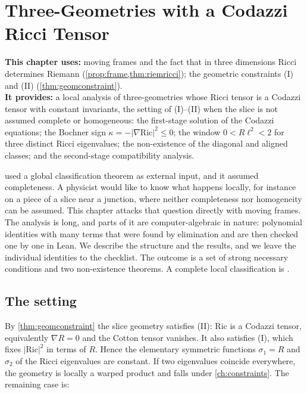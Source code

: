 \chapter{Three-Geometries with a Codazzi Ricci Tensor}
\label{ch:homogeneous}

\begin{usesbox}
\textbf{This chapter uses:} moving frames and the fact that in three dimensions Ricci determines Riemann (\cref{prop:frame,thm:riemricci}); the geometric constraints (I) and (II) (\cref{thm:geomconstraint}).\\
\textbf{It provides:} a local analysis of three-geometries whose Ricci tensor is a Codazzi tensor with constant invariants, the setting of (I)--(II) when the slice is not assumed complete or homogeneous: the first-stage solution of the Codazzi equations; the Bochner sign $\kappa=-|\nabla\mathrm{Ric}|^2\le0$; the window $0<R\ell^2<2$ for three distinct Ricci eigenvalues; the non-existence of the diagonal and aligned classes; and the second-stage compatibility analysis.
\end{usesbox}

 used a global classification theorem as external input, and it assumed completeness. A physicist would like to know what happens locally, for instance on a piece of a slice near a junction, where neither completeness nor homogeneity can be assumed. This chapter attacks that question directly with moving frames. The analysis is long, and parts of it are computer-algebraic in nature: polynomial identities with many terms that were found by elimination and are then checked one by one in Lean. We describe the structure and the results, and we leave the individual identities to the checklist. The outcome is a set of strong necessary conditions and two non-existence theorems. A complete local classification is \opn.

\section{The setting}

By \cref{thm:geomconstraint} the slice geometry satisfies (II): $\mathrm{Ric}$ is a Codazzi tensor, equivalently $\nabla R=0$ and the Cotton tensor vanishes. It also satisfies (I), which fixes $|\mathrm{Ric}|^2$ in terms of $R$. Hence the elementary symmetric functions $\sigma_1=R$ and $\sigma_2$ of the Ricci eigenvalues are constant. If two eigenvalues coincide everywhere, the geometry is locally a warped product and falls under \cref{ch:constraints}. The remaining case is:

